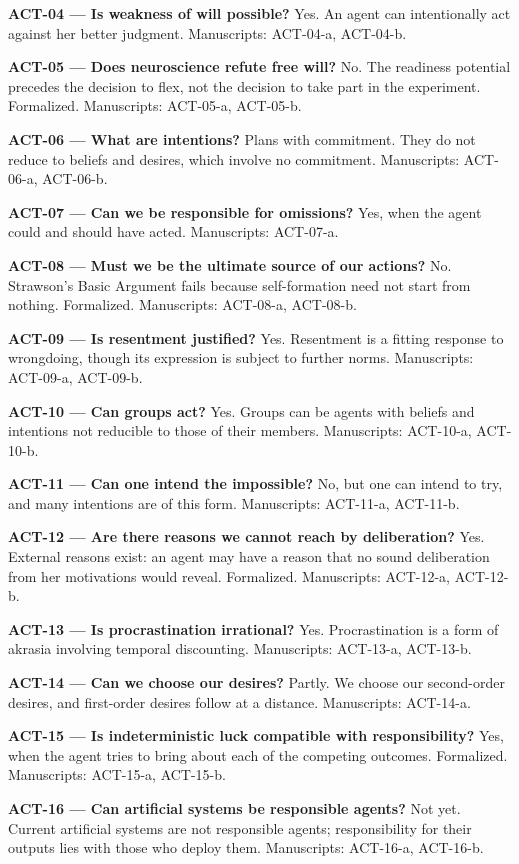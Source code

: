 \documentclass[10pt]{article}
\begin{document}
\textbf{ACT-04 --- Is weakness of will possible?} Yes. An agent can intentionally act against her better judgment. Manuscripts: ACT-04-a, ACT-04-b.

\textbf{ACT-05 --- Does neuroscience refute free will?} No. The readiness potential precedes the decision to flex, not the decision to take part in the experiment. Formalized. Manuscripts: ACT-05-a, ACT-05-b.

\textbf{ACT-06 --- What are intentions?} Plans with commitment. They do not reduce to beliefs and desires, which involve no commitment. Manuscripts: ACT-06-a, ACT-06-b.

\textbf{ACT-07 --- Can we be responsible for omissions?} Yes, when the agent could and should have acted. Manuscripts: ACT-07-a.

\textbf{ACT-08 --- Must we be the ultimate source of our actions?} No. Strawson's Basic Argument fails because self-formation need not start from nothing. Formalized. Manuscripts: ACT-08-a, ACT-08-b.

\textbf{ACT-09 --- Is resentment justified?} Yes. Resentment is a fitting response to wrongdoing, though its expression is subject to further norms. Manuscripts: ACT-09-a, ACT-09-b.

\textbf{ACT-10 --- Can groups act?} Yes. Groups can be agents with beliefs and intentions not reducible to those of their members. Manuscripts: ACT-10-a, ACT-10-b.

\textbf{ACT-11 --- Can one intend the impossible?} No, but one can intend to try, and many intentions are of this form. Manuscripts: ACT-11-a, ACT-11-b.

\textbf{ACT-12 --- Are there reasons we cannot reach by deliberation?} Yes. External reasons exist: an agent may have a reason that no sound deliberation from her motivations would reveal. Formalized. Manuscripts: ACT-12-a, ACT-12-b.

\textbf{ACT-13 --- Is procrastination irrational?} Yes. Procrastination is a form of akrasia involving temporal discounting. Manuscripts: ACT-13-a, ACT-13-b.

\textbf{ACT-14 --- Can we choose our desires?} Partly. We choose our second-order desires, and first-order desires follow at a distance. Manuscripts: ACT-14-a.

\textbf{ACT-15 --- Is indeterministic luck compatible with responsibility?} Yes, when the agent tries to bring about each of the competing outcomes. Formalized. Manuscripts: ACT-15-a, ACT-15-b.

\textbf{ACT-16 --- Can artificial systems be responsible agents?} Not yet. Current artificial systems are not responsible agents; responsibility for their outputs lies with those who deploy them. Manuscripts: ACT-16-a, ACT-16-b.
\end{document}
